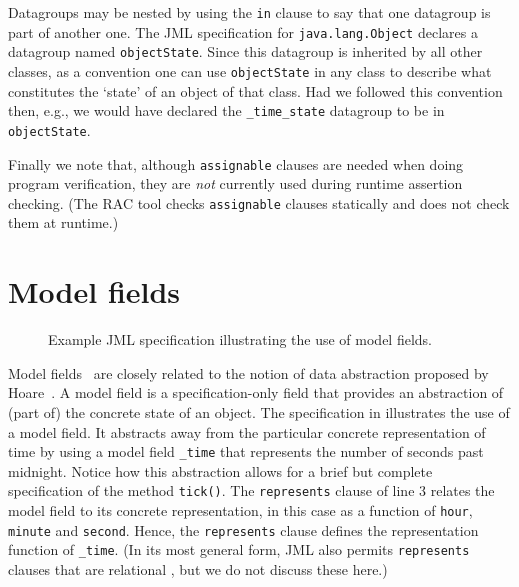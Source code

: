 \documentclass{llncs}
\begin{document}
Datagroups may be nested by using the \texttt{in} clause to say that
one datagroup is part of another one. The JML specification for
\texttt{java.lang.Object} declares a datagroup named
\texttt{objectState}. Since this datagroup 
is inherited by all other classes, as a convention one can use 
\texttt{objectState}
in any class to describe what constitutes the `state' of an object of that class.
Had we followed this convention then, e.g., we would have declared the 
\texttt{\_time\_state} datagroup to be in \texttt{objectState}. 

Finally we note that, although \texttt{assignable} clauses are needed
when doing program verification, they are \emph{not} currently used during
runtime assertion checking.
(The RAC tool checks \texttt{assignable} clauses
statically and does not check them at runtime.)

\newpage
\section{Model fields}
\label{Sec:model}

\begin{figure}[tbp] 
%
%
\vspace*{-2ex} %
\caption{Example JML specification illustrating the use of model fields.}
\label{Example:model}
\end{figure}


Model fields~\cite{Cheon-etal05} are closely related to the notion of
data abstraction proposed by 
Hoare~\cite{Hoare72}.  A model field is a specification-only field
that provides an abstraction of (part of) the concrete state of an object.  
%
The specification in  illustrates the use of a model field.
It abstracts away from the particular concrete representation of time
by using a model field \texttt{\_time} that represents the number of seconds
past midnight.
%
Notice how this abstraction allows for a brief but complete specification of the method \texttt{tick()}.
%
The \texttt{represents} clause of line 3 relates the model field to its
concrete representation, 
in this case as a function of \texttt{hour}, \texttt{minute} and 
\texttt{second}. Hence, the \texttt{represents} clause defines the 
representation function of \texttt{\_time}.  (In its most general form, JML also
permits \texttt{represents} clauses that are relational
\cite{Leavens-etal06}, but we do not discuss these here.)
\end{document}
